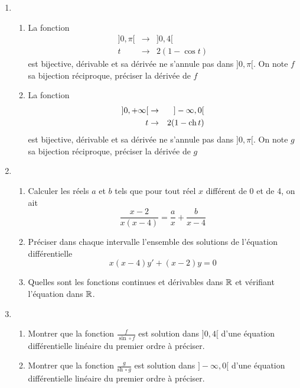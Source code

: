 \begin{enumerate}
  \item
    \begin{enumerate}
     \item La fonction
     \begin{eqnarray*}
     ]0,\pi[ & \rightarrow & ]0,4[\\
     t& \rightarrow &2(1-\cos t)
     \end{eqnarray*}
     est bijective, d{\'e}rivable et sa d{\'e}riv{\'e}e ne s'annule pas dans
     $]0,\pi[$. On note $f$ sa bijection r{\'e}ciproque, pr{\'e}ciser la
     d{\'e}riv{\'e}e de $f$
     \item La fonction
     \begin{eqnarray*}
     ]0,+\infty[ & \rightarrow & ]-\infty ,0[\\
     t& \rightarrow & 2(1-\operatorname{ch} t)
     \end{eqnarray*}
     est bijective, d{\'e}rivable et sa d{\'e}riv{\'e}e ne s'annule pas dans
     $]0,\pi[$. On note $g$ sa bijection r{\'e}ciproque, pr{\'e}ciser la
     d{\'e}riv{\'e}e de $g$

    \end{enumerate}

  \item
    \begin{enumerate}
     \item Calculer les r{\'e}els $a$ et $b$ tels que pour tout r{\'e}el
     $x$ diff{\'e}rent de 0 et de 4, on ait
     \[\frac{x-2}{x(x-4)}=\frac{a}{x}+\frac{b}{x-4}\]
     \item Pr{\'e}ciser  dans chaque intervalle l'ensemble des solutions de l'{\'e}quation
     diff{\'e}rentielle
     \[x(x-4)y'+(x-2)y=0\]
     \item Quelles sont les fonctions continues et d{\'e}rivables dans
     $\mathbb{R}$ et v{\'e}rifiant l'{\'e}quation dans
     $\mathbb{R}$.
    \end{enumerate}

  \item

    \begin{enumerate}
     \item Montrer que la fonction $\frac{f}{\sin \circ f}$ est
     solution dans $]0,4[$ d'une {\'e}quation diff{\'e}rentielle lin{\'e}aire du premier ordre {\`a} pr{\'e}ciser.
     \item Montrer que la fonction $\frac{g}{\mathrm{sh\,} \circ g}$ est
     solution dans $]-\infty,0[$  d'une {\'e}quation diff{\'e}rentielle lin{\'e}aire du premier ordre {\`a} pr{\'e}ciser.
    \end{enumerate}

\end{enumerate}
